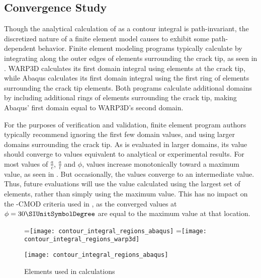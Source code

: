 \subsection{\J Convergence Study}

Though the analytical calculation of \J as a contour integral is path-invariant, the discretized nature of a finite element model causes \J to exhibit some path-dependent behavior.
Finite element modeling programs typically calculate \J by integrating along the outer edges of elements surrounding the crack tip, as seen in .
WARP3D calculates its first domain integral using elements at the crack tip, while Abaqus calculates its first domain integral using the first ring of elements surrounding the crack tip elements.
Both programs calculate additional \J domains by including additional rings of elements surrounding the crack tip, making Abaqus' first \J domain equal to WARP3D's second \J domain.

For the purposes of verification and validation, finite element program authors typically recommend ignoring the first few \J domain values, and using larger domains surrounding the crack tip.
As \J is evaluated in larger domains, its value should converge to values equivalent to analytical or experimental results.
For most values of \(\frac{a}{c}\), \(\frac{a}{t}\) and \(\phi\), \J values increase monotonically toward a maximum \J value, as seen in .
But occasionally, the \J values converge to an intermediate value.
Thus, future \J evaluations will use the value calculated using the largest set of elements, rather than simply using the maximum value.
This has no impact on the \J-CMOD criteria used in , as the converged \J values at \(\phi=30{\SIUnitSymbolDegree}\) are equal to the maximum \J value at that location.

\begin{figure}[tbp]
\centering
\begin{minipage}[b]{0.45\columnwidth}
=\hbox{\texttt{[image: contour\_integral\_regions\_abaqus]}}
=\hbox{\texttt{[image: contour\_integral\_regions\_warp3d]}}
\end{minipage}
\begin{minipage}[b]{0.45\columnwidth}
\texttt{[image: contour\_integral\_regions\_abaqus]}
\end{minipage}
\caption{\label{fig:fem-j-domains} Elements used in \J calculations}
\end{figure}

